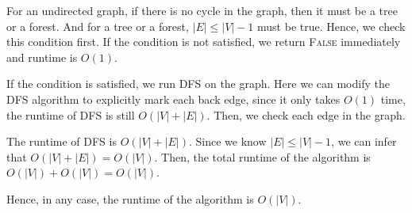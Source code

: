 \documentclass[a4paper,12pt]{article}
\begin{document}
For an undirected graph, if there is no cycle in the graph, then it must be a tree or a forest. 
And for a tree or a forest, $|E| \leq |V| - 1$ must be true.
Hence, we check this condition first.
If the condition is not satisfied, we return \textsc{False} immediately and runtime is $O(1)$.

If the condition is satisfied, we run DFS on the graph.
Here we can modify the DFS algorithm to explicitly mark each back edge, since it only takes $O(1)$ time, the runtime of DFS is still $O(|V| + |E|)$.
Then, we check each edge in the graph.

The runtime of DFS is $O(|V| + |E|)$.
Since we know $|E| \leq |V| - 1$, we can infer that $O(|V| + |E|) = O(|V|)$.
Then, the total runtime of the algorithm is $O(|V|) + O(|V|) = O(|V|)$.

Hence, in any case, the runtime of the algorithm is $O(|V|)$.
\end{document}
